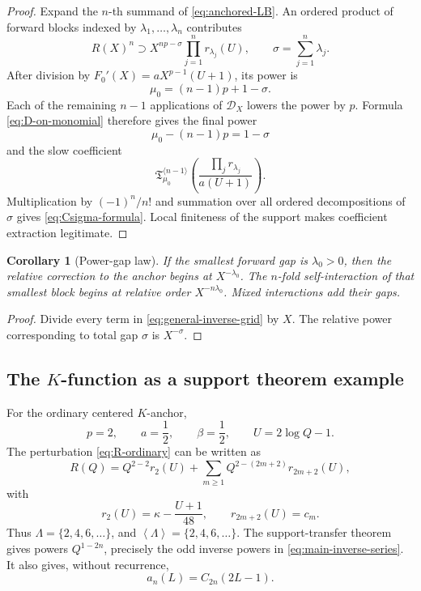 \documentclass[11pt,oneside]{article}
\theoremstyle{plain}
\newtheorem{corollary}[theorem]{Corollary}
\theoremstyle{definition}
\theoremstyle{remark}
\newcommand{\calD}{\mathcal{D}}
\newcommand{\angles}[1]{\left\langle #1\right\rangle}
\begin{document}
\begin{proof}
Expand the \(n\)-th summand of \eqref{eq:anchored-LB}.  An ordered product of
forward blocks indexed by \(\lambda_1,\ldots,\lambda_n\) contributes
\[
 R(X)^n\supset X^{np-\sigma}
 \prod_{j=1}^nr_{\lambda_j}(U),
 \qquad \sigma=\sum_{j=1}^n\lambda_j.
\]
After division by \(F_0'(X)=aX^{p-1}(U+1)\), its power is
\[
 \mu_0=(n-1)p+1-\sigma.
\]
Each of the remaining \(n-1\) applications of \(\calD_X\) lowers the power by
\(p\).  Formula \eqref{eq:D-on-monomial} therefore gives the final power
\[
 \mu_0-(n-1)p=1-\sigma
\]
and the slow coefficient
\[
 \mathfrak{T}^{\langle n-1\rangle}_{\mu_0}
 \left(\frac{\prod_jr_{\lambda_j}}{a(U+1)}\right).
\]
Multiplication by \((-1)^n/n!\) and summation over all ordered decompositions
of \(\sigma\) gives \eqref{eq:Csigma-formula}.  Local finiteness of the support
makes coefficient extraction legitimate.
\end{proof}

\begin{corollary}[Power-gap law]
\label{cor:power-gap-law}
If the smallest forward gap is \(\lambda_0>0\), then the relative correction to
the anchor begins at \(X^{-\lambda_0}\).  The \(n\)-fold self-interaction of
that smallest block begins at relative order \(X^{-n\lambda_0}\).  Mixed
interactions add their gaps.
\end{corollary}

\begin{proof}
Divide every term in \eqref{eq:general-inverse-grid} by \(X\).  The relative
power corresponding to total gap \(\sigma\) is \(X^{-\sigma}\).
\end{proof}

\subsection{The \texorpdfstring{\(K\)-function}{K-function} as a support theorem example}

For the ordinary centered \(K\)-anchor,
\begin{equation}
 p=2,
 \qquad a=\frac12,
 \qquad \beta=\frac12,
 \qquad U=2\log Q-1.
 \label{eq:K-general-parameters}
\end{equation}
The perturbation \eqref{eq:R-ordinary} can be written as
\begin{equation}
 R(Q)=Q^{2-2}r_2(U)+
 \sum_{m\ge1}Q^{2-(2m+2)}r_{2m+2}(U),
 \label{eq:K-R-grid}
\end{equation}
with
\begin{equation}
 r_2(U)=\kappa-\frac{U+1}{48},
 \qquad
 r_{2m+2}(U)=c_m.
 \label{eq:K-r-lambda}
\end{equation}
Thus \(\Lambda=\{2,4,6,\ldots\}\), and
\(\angles{\Lambda}=\{2,4,6,\ldots\}\).  The support-transfer theorem gives
powers \(Q^{1-2n}\), precisely the odd inverse powers in
\eqref{eq:main-inverse-series}.  It also gives, without recurrence,
\begin{equation}
 a_n(L)=C_{2n}(2L-1).
 \label{eq:an-Csigma}
\end{equation}
\end{document}
